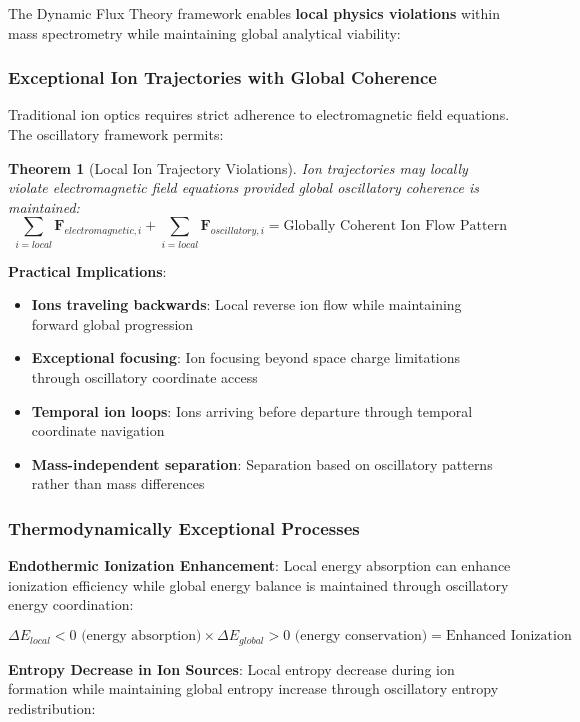 \documentclass[11pt,a4paper]{article}
\newtheorem{theorem}{Theorem}[section]
\theoremstyle{remark}
\begin{document}
The Dynamic Flux Theory framework enables \textbf{local physics violations} within mass spectrometry while maintaining global analytical viability:

\subsubsection{Exceptional Ion Trajectories with Global Coherence}

Traditional ion optics requires strict adherence to electromagnetic field equations. The oscillatory framework permits:

\begin{theorem}[Local Ion Trajectory Violations]
Ion trajectories may locally violate electromagnetic field equations provided global oscillatory coherence is maintained:
$$\sum_{i=local} \mathbf{F}_{electromagnetic,i} + \sum_{i=local} \mathbf{F}_{oscillatory,i} = \text{Globally Coherent Ion Flow Pattern}$$
\end{theorem}

\textbf{Practical Implications}:
\begin{itemize}
\item \textbf{Ions traveling backwards}: Local reverse ion flow while maintaining forward global progression
\item \textbf{Exceptional focusing}: Ion focusing beyond space charge limitations through oscillatory coordinate access
\item \textbf{Temporal ion loops}: Ions arriving before departure through temporal coordinate navigation
\item \textbf{Mass-independent separation}: Separation based on oscillatory patterns rather than mass differences
\end{itemize}

\subsubsection{Thermodynamically Exceptional Processes}

\textbf{Endothermic Ionization Enhancement}:
Local energy absorption can enhance ionization efficiency while global energy balance is maintained through oscillatory energy coordination:

$$\Delta E_{local} < 0 \text{ (energy absorption)} \times \Delta E_{global} > 0 \text{ (energy conservation)} = \text{Enhanced Ionization}$$

\textbf{Entropy Decrease in Ion Sources}:
Local entropy decrease during ion formation while maintaining global entropy increase through oscillatory entropy redistribution:
\end{document}
